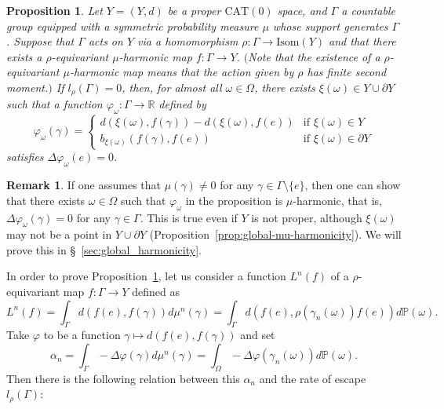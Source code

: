 \documentclass[12pt]{amsart}
\numberwithin{equation}{section}
\theoremstyle{plain}
\newtheorem{Proposition}[Theorem]{Proposition}
\theoremstyle{definition}
\newtheorem{Remark}[Theorem]{Remark}
\theoremstyle{remark}
\newcommand{\R}{{\mathbb R}}
\newcommand{\isom}[1]{\mathrm{Isom}({#1})}
\newcommand{\cat}[1]{\mathrm{CAT}(#1)}
\begin{document}
%
%
\begin{Proposition}
\label{prop:mu-harmonicity}
 Let $Y=(Y,d)$ be a proper $\cat{0}$ space, and $\Gamma$ a 
 countable group equipped with a symmetric probability measure $\mu$
 whose support generates $\Gamma$.
 Suppose that $\Gamma$ acts on $Y$ via a homomorphism 
 $\rho\colon \Gamma \rightarrow \isom{Y}$ and that
 there exists a $\rho$-equivariant $\mu$-harmonic map
 $f\colon \Gamma \rightarrow Y$. 
 $($Note that the existence of a $\rho$-equivariant $\mu$-harmonic
 map means that the action given by $\rho$ has finite second moment.$)$
 If $l_{\rho}(\Gamma)=0$, then, for almost all $\omega \in \Omega$,
 there exists 
 $\xi(\omega) \in Y\cup \partial Y$ such that a function 
 $\varphi_{\omega} \colon \Gamma \rightarrow \R$ defined by 
 \begin{equation*}
  \varphi_{\omega}(\gamma) =
   \begin{cases}
    d(\xi(\omega), f(\gamma))-d(\xi(\omega), f(e)) 
    & \text{if } \xi(\omega) \in    Y \\
    b_{\xi(\omega)}(f(\gamma), f(e)) 
    & \text{if } \xi(\omega) \in \partial Y 
   \end{cases}
 \end{equation*}
 satisfies $\Delta \varphi_{\omega}(e)=0$. 
\end{Proposition}

\begin{Remark}
 If one assumes that $\mu(\gamma)\not= 0$ for any 
 $\gamma \in \Gamma\setminus\{e\}$, then one can show that there exists
 $\omega \in \Omega$ such that $\varphi_{\omega}$ in the proposition 
 is $\mu$-harmonic, that is, $\Delta \varphi_{\omega}(\gamma)=0$ for any 
 $\gamma \in \Gamma$. 
 This is true even if $Y$ is not proper, although $\xi(\omega)$ may not
 be a point in $Y\cup \partial Y$ 
 (Proposition~\ref{prop:global-mu-harmonicity}). 
 We will prove this in \S~\ref{sec:global_harmonicity}. 
\end{Remark}

%
% 
In order to prove Proposition~\ref{prop:mu-harmonicity},  
let us consider a function $L^n(f)$ of a $\rho$-equivariant map 
$f \colon \Gamma \rightarrow Y$ defined as
\begin{equation*}
 L^n(f) = \int_{\Gamma} d(f(e), f(\gamma)) d\mu^n(\gamma)
  = \int_{\Gamma} d(f(e),\rho(\gamma_n(\omega))f(e))
  d\mathbb{P}(\omega). 
\end{equation*}
Take $\varphi$ to be a function
$\gamma \mapsto d(f(e), f(\gamma))$ and set
\begin{equation*}
 \alpha_n = \int_{\Gamma} -\Delta \varphi(\gamma) d\mu^n(\gamma)
 = \int_{\Omega} -\Delta \varphi(\gamma_n(\omega)) d\mathbb{P}(\omega). 
\end{equation*} 
Then there is the following relation between this $\alpha_n$ and 
the rate of escape $l_{\rho}(\Gamma)$: 
\end{document}
